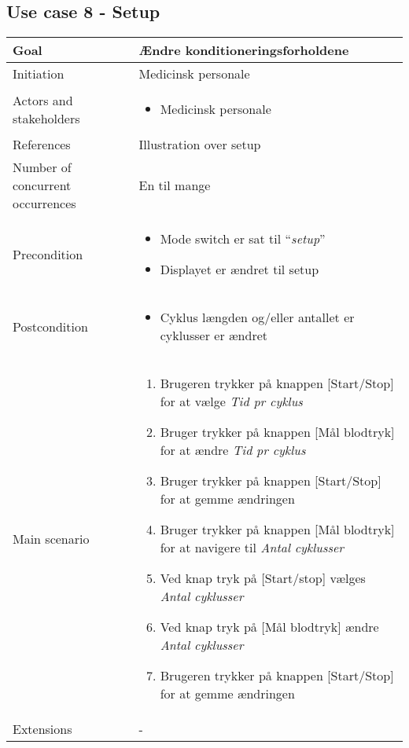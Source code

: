 	\subsection{Use case 8 - Setup}
		\begin{center}
			\begin{tabular}{ | m{4cm} | m{8cm}| } 
				\hline
				Goal& Ændre konditioneringsforholdene \\ 
				\hline
				Initiation &  Medicinsk personale\\
				\hline
				Actors and stakeholders & 
				\begin{itemize}
					\item Medicinsk personale 
				\end{itemize} \\ 
				\hline
				References & Illustration over setup \\ 
				\hline
				Number of concurrent occurrences & En til mange \\ 
				\hline	
				Precondition & 
				\begin{itemize}
					\item Mode switch er sat til “\textit{setup}” 
					\item Displayet er ændret til setup
 				\end{itemize} \\ 
				\hline
				Postcondition & 
				\begin{itemize}
					\item Cyklus længden og/eller antallet er cyklusser er ændret
				\end{itemize} \\ 
				\hline
				Main scenario & \begin{enumerate}
					\setlength\itemsep{0cm} %
					\item Brugeren trykker på knappen [Start/Stop] for at vælge \textit{Tid pr cyklus}
					\item Bruger trykker på knappen [Mål blodtryk] for at ændre \textit{Tid pr cyklus}
					\item Bruger trykker på knappen [Start/Stop] for at gemme ændringen
					\item Bruger trykker på knappen [Mål blodtryk] for at navigere til \textit{Antal cyklusser}
					\item Ved knap tryk på [Start/stop] vælges \textit{Antal cyklusser}
					\item Ved knap tryk på [Mål blodtryk] ændre \textit{Antal cyklusser}
					\item Brugeren trykker på knappen [Start/Stop] for at gemme ændringen
				\end{enumerate} \\ 
				\hline
				Extensions & -  \\ 
				\hline
			\end{tabular}
		\end{center}
			\pagebreak

